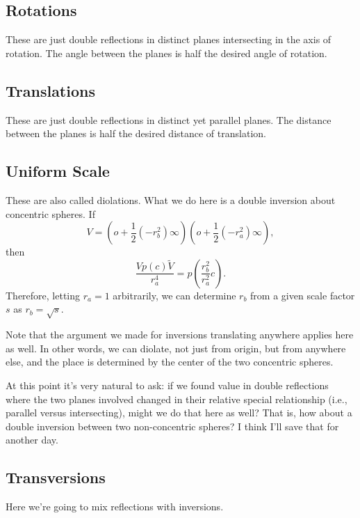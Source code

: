 \documentclass[12pt]{article}
\newcommand{\nvao}{o}
\newcommand{\nvai}{\infty}
\begin{document}
\subsection*{Rotations}

These are just double reflections in distinct planes intersecting in the axis of rotation.
The angle between the planes is half the desired angle of rotation.

\subsection*{Translations}

These are just double reflections in distinct yet parallel planes.
The distance between the planes is half the desired distance of translation.

\subsection*{Uniform Scale}

These are also called diolations.
What we do here is a double inversion about concentric spheres.
If
\begin{equation*}
V=(\nvao+\frac{1}{2}(-r_b^2)\nvai)(\nvao+\frac{1}{2}(-r_a^2)\nvai),
\end{equation*}
then
\begin{equation*}
\frac{Vp(c)\tilde{V}}{r_a^4} = p\left(\frac{r_b^2}{r_a^2}c\right).
\end{equation*}
Therefore, letting $r_a=1$ arbitrarily, we can determine $r_b$ from a given scale factor $s$ as $r_b=\sqrt{s}$.

Note that the argument we made for inversions translating anywhere applies here as well.
In other words, we can diolate, not just from origin, but from anywhere else, and the place is
determined by the center of the two concentric spheres.

At this point it's very natural to ask: if we found value in double reflections where the two
planes involved changed in their relative special relationship (i.e., parallel versus intersecting),
might we do that here as well?
That is, how about a double inversion between two non-concentric spheres?
I think I'll save that for another day.

\subsection*{Transversions}

Here we're going to mix reflections with inversions.
\end{document}
